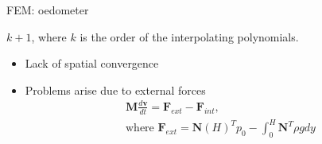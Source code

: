 \documentclass[mathserif,professionalfont,hyperref={pdfpagelabels=false}]{beamer}
\begin{document}

% 
% 
\begin{frame}{FEM: oedometer}
	\begin{tcolorbox}[colback=red!5,colframe=red!50!black,title=Theoretical order of accuracy]
	$k+1$, where $k$ is the order of the interpolating polynomials\footnotemark.
	\end{tcolorbox}
	\pause
	\begin{tcolorbox}[colback=blue!5,colframe=blue!40!black,title=Observations]
	\begin{itemize}
	 \item Lack of spatial convergence
	 \item Problems arise due to external forces\\
	 \begin{align}\nonumber
	 & \mathbf{M}\frac{d \mathbf{v}}{dt} = \mathbf{F}_{ext}-\mathbf{F}_{int},\\ \nonumber
	 & \mbox{where } \mathbf{F}_{ext} = \mathbf{N}(H)^Tp_0 - \int_0^H \mathbf{N}^T\rho g dy
	 \end{align}
	\end{itemize}

	\end{tcolorbox}
\end{frame}
\end{document}
